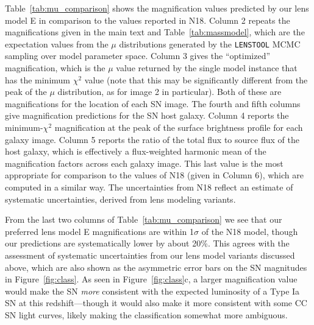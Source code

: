 \documentclass[12pt]{article}
\def\lenstool{{\tt LENSTOOL}\xspace}
\begin{document}
Table~\ref{tab:mu_comparison} shows the magnification values predicted by our lens model E in comparison to the values reported in N18. 
Column 2 repeats the magnifications given in the main text and Table~\ref{tab:massmodel}, which are the expectation values from the $\mu$ distributions generated by the \lenstool MCMC sampling over model parameter space.  Column 3 gives the ``optimized'' magnification, which is the $\mu$ value returned by the single model instance that has the minimum $\chi^2$ value (note that this may be significantly different from the peak of the $\mu$ distribution, as for image 2 in particular).  Both of these are magnifications for the location of each SN image. The fourth and fifth columns give magnification predictions for the SN host galaxy. Column 4 reports the minimum-$\chi^2$ magnification at the peak of the surface brightness profile for each galaxy image.  Column 5 reports the
ratio of the total flux to source flux of the host galaxy, which is effectively a flux-weighted harmonic mean of the magnification factors across each galaxy image. This last value is the most appropriate for comparison to the values of N18 (given in Column 6), which are computed in a similar way.  The uncertainties from N18 reflect an estimate of systematic uncertainties, derived from lens modeling variants. 

From the last two columns of Table~\ref{tab:mu_comparison} we see that our preferred lens model E magnifications are within 1$\sigma$ of the N18 model, though our predictions are systematically lower by about 20\%.  This agrees with the assessment of systematic uncertainties from our lens model variants discussed above, which are also shown as the asymmetric error bars on the SN magnitudes in Figure~\ref{fig:class}.  As seen in Figure~\ref{fig:class}c, a larger magnification value would make the SN {\it more} consistent with the expected luminosity of a Type Ia SN at this redshift---though it would also make it more consistent with some CC SN light curves, likely making the classification somewhat more ambiguous. 

\end{document}
